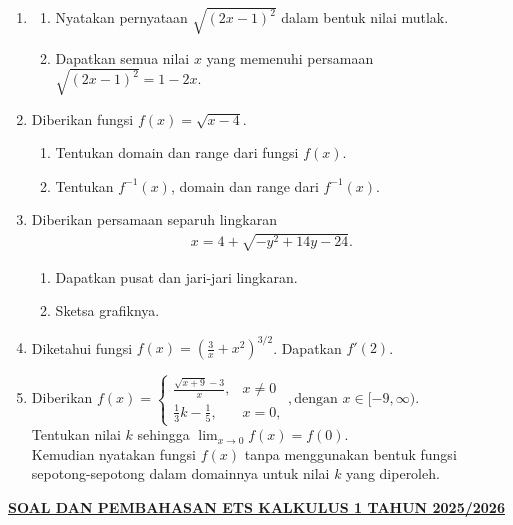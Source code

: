 \documentclass[10pt,openany,a4paper]{article}
\theoremstyle{definition}
\theoremstyle{definition}
\theoremstyle{plain}
\begin{document}
\begin{enumerate}
    \item \begin{enumerate}
        \item Nyatakan pernyataan $\sqrt{(2x-1)^2}$ dalam bentuk nilai mutlak.
        \item Dapatkan semua nilai $x$ yang memenuhi persamaan $\sqrt{(2x-1)^2}=1-2x$.
    \end{enumerate}
    \item Diberikan fungsi $f(x)=\sqrt{x-4}$.
    \begin{enumerate}
        \item Tentukan domain dan range dari fungsi $f(x)$.
        \item Tentukan $f^{-1}(x)$, domain dan range dari $f^{-1}(x)$.
    \end{enumerate}
    \item Diberikan persamaan separuh lingkaran 
    \begin{align*}
       x=4+\sqrt{-y^2+14y-24}.
    \end{align*}
    \begin{enumerate}
        \item Dapatkan pusat dan jari-jari lingkaran. 
        \item Sketsa grafiknya.
    \end{enumerate}
    \item Diketahui fungsi $f(x)=\left(\frac{3}{x}+x^2\right)^{3/2}$. Dapatkan $f'(2)$.
    \item Diberikan $f(x)=\begin{cases}
        \frac{\sqrt{x+9}-3}{x}, &x\neq 0\\
        \frac{1}{3}k-\frac{1}{5}, &x=0,
    \end{cases}, \text{dengan } x\in [-9,\infty)$.\\
    Tentukan nilai $k$ sehingga $\displaystyle\lim_{x\to 0}f(x)=f(0)$.\\
    Kemudian nyatakan fungsi $f(x)$ tanpa menggunakan bentuk fungsi sepotong-sepotong dalam domainnya untuk nilai $k$ yang diperoleh.
\end{enumerate}
\newpage
 \begin{center}
	{\underline{\textbf{\MakeUppercase{Soal dan Pembahasan ETS Kalkulus 1 Tahun 2025/2026}}}}
    \end{center}
\end{document}
